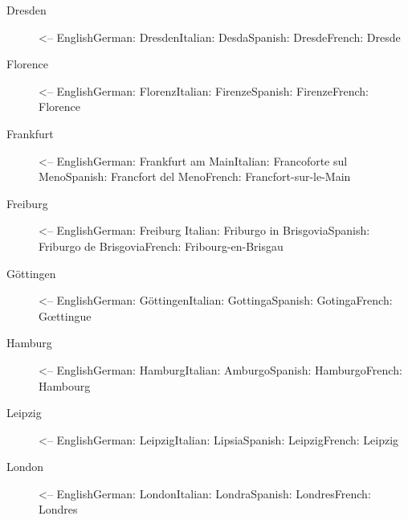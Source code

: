 \documentclass[a4paper,
10pt,
greek,
french,
spanish,
italian,
ngerman,
english
]{ltxdoc}
\begin{document}
\begin{multicols}{3}
\begin{description}
\item[Dresden] <-- English\newline German: Dresden\newline Italian: Desda\newline Spanish: Dresde\newline French: Dresde
\item[Florence] <-- English\newline German: Florenz\newline Italian: Firenze\newline Spanish: Firenze\newline French: Florence
\item[Frankfurt] <-- English\newline German: Frankfurt am Main\newline Italian: Francoforte sul Meno\newline Spanish: Francfort del Meno\newline French: Francfort-sur-le-Main
\item[Freiburg] <-- English\newline German: Freiburg \newline Italian: Friburgo in Brisgovia\newline Spanish: Friburgo de Brisgovia\newline French: Fribourg-en-Brisgau
\item[Göttingen] <-- English\newline German: Göttingen\newline Italian: Gottinga\newline Spanish: Gotinga\newline French: Gœttingue
\item[Hamburg] <-- English\newline German: Hamburg\newline Italian: Amburgo\newline Spanish: Hamburgo\newline French: Hambourg
\item[Leipzig] <-- English\newline German: Leipzig\newline Italian: Lipsia\newline Spanish: Leipzig\newline French: Leipzig
\item[London] <-- English\newline German: London\newline Italian: Londra\newline Spanish: Londres\newline French: Londres

\end{description}
\end{multicols}
\end{document}
